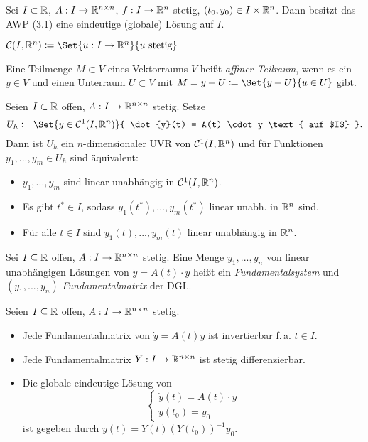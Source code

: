 \documentclass{cheat-sheet}
\begin{document}
\begin{satz}
  Sei $I \subset \mathbb{R}$, $A : I \to \mathbb{R}^{n \times n}$, $f : I \to \mathbb{R}^n$ stetig, $(t_0, y_0) \in I \times \mathbb{R}^n$. Dann besitzt das AWP (3.1) eine eindeutige (globale) Lösung auf $I$.
\end{satz}

\begin{nota}
  $\mathcal{C}(I, \R^n) \coloneqq \Set{ u : I \to \R^n }{ u \text{ stetig} }$
\end{nota}


\begin{defn}
  Eine Teilmenge $M \subset V$ eines Vektorraums $V$ heißt \emph{affiner Teilraum}, wenn es ein $y \in V$ und einen Unterraum $U \subset V$ mit $M = y + U \coloneqq \Set{ y + U }{ u \in U }$ gibt.
\end{defn}

\begin{satz}
  Seien $I \subset \mathbb{R}$ offen, $A : I \to \mathbb{R}^{n \times n}$ stetig. Setze
  \[ U_h \coloneqq \Set{ y \in \mathcal{C}^1(I, \R^n) }{ \dot{y}(t) = A(t) \cdot y \text{ auf $I$} }. \]
  Dann ist $U_h$ ein $n$-dimensionaler UVR von $\mathcal{C}^1(I, \mathbb{R}^n)$ und für Funktionen $y_1, ..., y_m \in U_h$ sind äquivalent:
  \begin{itemize}
    \item $y_1, ..., y_m$ sind linear unabhängig in $\mathcal{C}^1(I, \mathbb{R}^n)$.
    \item Es gibt $t^* \in I$, sodass $y_1(t^*), ..., y_m(t^*)$ linear unabh. in $\mathbb{R}^n$ sind.
    \item Für alle $t \in I$ sind $y_1(t), ..., y_m(t)$ linear unabhängig in $\mathbb{R}^n$.
  \end{itemize}
\end{satz}


\begin{defn}
  Sei $I \subseteq \mathbb{R}$ offen, $A : I \to \mathbb{R}^{n \times n}$ stetig. Eine Menge $y_1, ..., y_n$ von linear unabhängigen Lösungen von $\dot{y} = A(t) \cdot y$ heißt ein \emph{Fundamentalsystem} und $(y_1, ..., y_n)$ \emph{Fundamentalmatrix} der DGL.
\end{defn}

\begin{satz}
  Seien $I \subseteq \mathbb{R}$ offen, $A : I \to \mathbb{R}^{n \times n}$ stetig.
  \begin{itemize}
    \item Jede Fundamentalmatrix von $\dot{y} = A(t) y$ ist invertierbar f.\,a. $t \in I$.
    \item Jede Fundamentalmatrix $Y : I \to \mathbb{R}^{n \times n}$ ist stetig differenzierbar.
    \item Die globale eindeutige Lösung von
    \[
      \left\{ \begin{array}{l}
        \dot{y}(t) = A(t) \cdot y\\
        y(t_0) = y_0
        \end{array} 
      \right.
    \]
    ist gegeben durch $y(t) = Y(t) \left( Y(t_0) \right)^{-1} y_0$.
  \end{itemize}
\end{satz}
\end{document}
